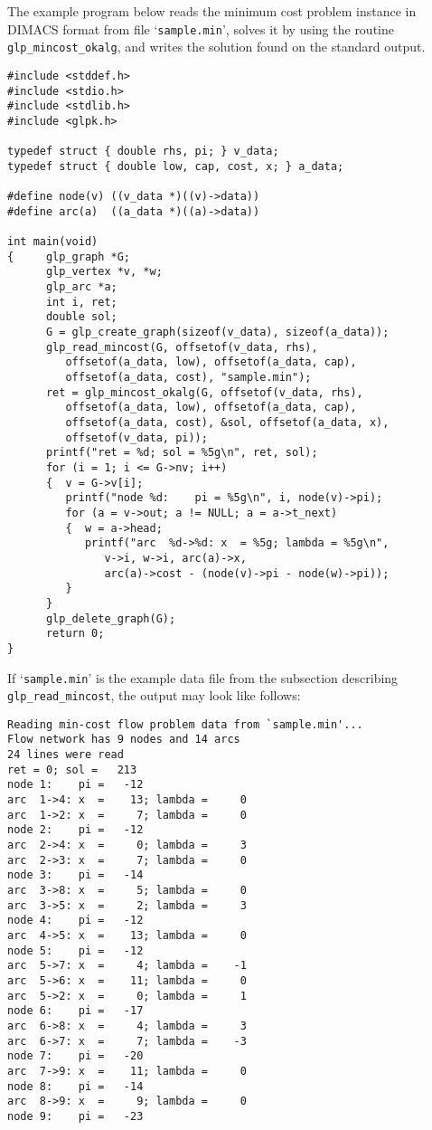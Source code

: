 \documentclass[11pt]{report}
\def\para#1{\noindent{\bf#1}}
\begin{document}
\para{Example}

The example program below reads the minimum cost problem instance in
DIMACS format from file `\verb|sample.min|', solves it by using the
routine \verb|glp_mincost_okalg|, and writes the solution found on the
standard output.

\begin{footnotesize}
\begin{verbatim}
#include <stddef.h>
#include <stdio.h>
#include <stdlib.h>
#include <glpk.h>

typedef struct { double rhs, pi; } v_data;
typedef struct { double low, cap, cost, x; } a_data;

#define node(v) ((v_data *)((v)->data))
#define arc(a)  ((a_data *)((a)->data))

int main(void)
{     glp_graph *G;
      glp_vertex *v, *w;
      glp_arc *a;
      int i, ret;
      double sol;
      G = glp_create_graph(sizeof(v_data), sizeof(a_data));
      glp_read_mincost(G, offsetof(v_data, rhs),
         offsetof(a_data, low), offsetof(a_data, cap),
         offsetof(a_data, cost), "sample.min");
      ret = glp_mincost_okalg(G, offsetof(v_data, rhs),
         offsetof(a_data, low), offsetof(a_data, cap),
         offsetof(a_data, cost), &sol, offsetof(a_data, x),
         offsetof(v_data, pi));
      printf("ret = %d; sol = %5g\n", ret, sol);
      for (i = 1; i <= G->nv; i++)
      {  v = G->v[i];
         printf("node %d:    pi = %5g\n", i, node(v)->pi);
         for (a = v->out; a != NULL; a = a->t_next)
         {  w = a->head;
            printf("arc  %d->%d: x  = %5g; lambda = %5g\n",
               v->i, w->i, arc(a)->x,
               arc(a)->cost - (node(v)->pi - node(w)->pi));
         }
      }
      glp_delete_graph(G);
      return 0;
}
\end{verbatim}
\end{footnotesize}

If `\verb|sample.min|' is the example data file from the subsection
describing \verb|glp_read_mincost|, the output may look like follows:

\begin{footnotesize}
\begin{verbatim}
Reading min-cost flow problem data from `sample.min'...
Flow network has 9 nodes and 14 arcs
24 lines were read
ret = 0; sol =   213
node 1:    pi =   -12
arc  1->4: x  =    13; lambda =     0
arc  1->2: x  =     7; lambda =     0
node 2:    pi =   -12
arc  2->4: x  =     0; lambda =     3
arc  2->3: x  =     7; lambda =     0
node 3:    pi =   -14
arc  3->8: x  =     5; lambda =     0
arc  3->5: x  =     2; lambda =     3
node 4:    pi =   -12
arc  4->5: x  =    13; lambda =     0
node 5:    pi =   -12
arc  5->7: x  =     4; lambda =    -1
arc  5->6: x  =    11; lambda =     0
arc  5->2: x  =     0; lambda =     1
node 6:    pi =   -17
arc  6->8: x  =     4; lambda =     3
arc  6->7: x  =     7; lambda =    -3
node 7:    pi =   -20
arc  7->9: x  =    11; lambda =     0
node 8:    pi =   -14
arc  8->9: x  =     9; lambda =     0
node 9:    pi =   -23
\end{verbatim}
\end{footnotesize}
\end{document}
